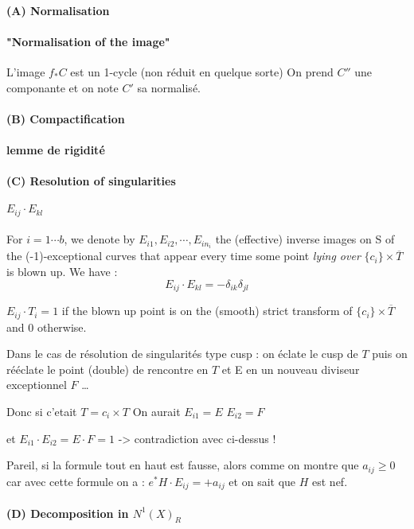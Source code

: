 \paragraph*{(A) Normalisation}
\paragraph*{"Normalisation of the image"}
L'image $f_*C$ est un 1-cycle
(non réduit en quelque sorte)
On prend $C''$ une componante et on note $C'$ sa normalisé.
\paragraph*{(B) Compactification}
\paragraph*{lemme de rigidité}
\paragraph*{(C) Resolution of singularities}
\paragraph*{$E_{ij} \cdot E_{kl}$}
For $i=1 \cdots b$, we denote by $E_{i1}, E_{i2}, \cdots, E_{in_i}$ the (effective) inverse images on S of the (-1)-exceptional curves that appear every time some point \textit{lying over} $\{c_i\}\times \overline{T}$ is blown up. We have : 
\[
E_{ij} \cdot E_{kl} = -\delta_{ik}\delta_{jl}
\]



$E_{ij} \cdot T_i = 1$ if the blown up point is on the (smooth) strict transform of $\{c_i\} \times \overline{T}$ and $0$ otherwise. 



Dans le cas de résolution de singularités type cusp : on éclate le cusp de $T$ puis on rééclate le point (double) de rencontre en $T$ et E en un nouveau diviseur exceptionnel $F$ …

Donc si c'etait $T = c_i \times T$
On aurait $E_{i1} = E$
$E_{i2} = F$

et $E_{i1} \cdot E_{i2} = E \cdot F = 1$   -> contradiction avec ci-dessus !


Pareil, si la formule tout en haut est fausse, alors comme on montre que $a_{ij} \geq 0$ car avec cette formule on a :
$e^* H \cdot E_{ij} = +a_{ij}$ et on sait que $H$ est nef.
\paragraph*{(D) Decomposition in $N^1(X)_R$}
